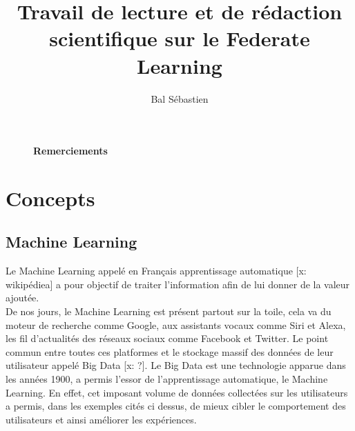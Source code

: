 \documentclass[12pt,a4paper]{report}
\begin{document}
\title{\Large{\Large {Travail de lecture et de rédaction scientifique sur le Federate Learning}}}

\author{Bal Sébastien}

\maketitle

\thispagestyle{empty} %

\fancyhead[LE,RO]{\leftmark}

\fancyhead[RE,LO]{}



 


\begin{figure}[p]

\large\textbf{Remerciements}


\end{figure}

\tableofcontents
\thispagestyle{empty} %

\fancyfoot[R]{\thepage}

\chapter{Concepts}
\section{Machine Learning}
\thispagestyle{plain}\setcounter{page}{1} %
Le Machine Learning appelé en Français apprentissage automatique [x: wikipédiea] a pour objectif de traiter l'information afin de lui donner de la valeur ajoutée.\\

De nos jours, le Machine Learning est présent partout sur la toile, cela va du moteur de recherche comme Google, aux assistants vocaux comme Siri et Alexa, les fil d'actualités des réseaux sociaux comme Facebook et Twitter. Le point commun entre toutes ces platformes et le stockage massif des données de leur utilisateur appelé Big Data [x: ?]. Le Big Data est une technologie apparue dans les années 1900, a permis l'essor de l'apprentissage automatique, le Machine Learning. En effet, cet imposant volume de données collectées sur les utilisateurs a permis, dans les exemples cités ci dessus, de mieux cibler le comportement des utilisateurs et ainsi améliorer les expériences.\\
\end{document}
